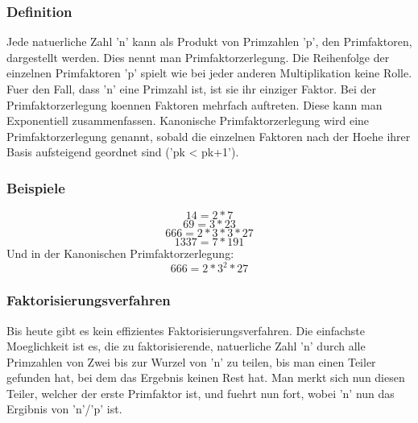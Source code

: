 \subsubsection{Definition}
Jede natuerliche Zahl 'n' kann als Produkt von Primzahlen 'p', den Primfaktoren, dargestellt werden. Dies nennt man Primfaktorzerlegung. Die Reihenfolge der einzelnen Primfaktoren 'p' spielt wie bei jeder anderen Multiplikation keine Rolle. Fuer den Fall, dass 'n' eine Primzahl ist, ist sie ihr einziger Faktor. Bei der Primfaktorzerlegung koennen Faktoren mehrfach auftreten. Diese kann man Exponentiell zusammenfassen. Kanonische Primfaktorzerlegung wird eine Primfaktorzerlegung genannt, sobald die einzelnen Faktoren nach der Hoehe ihrer Basis aufsteigend geordnet sind ('pk < pk+1').
\subsubsection{Beispiele}
\begin{equation}
14 = 2 * 7
\end{equation}
\begin{equation}
69 = 3 * 23
\end{equation}
\begin{equation}
666 = 2 * 3 * 3 * 27
\end{equation}
\begin{equation}
1337 = 7 * 191
\end{equation}
Und in der Kanonischen Primfaktorzerlegung:
\begin{equation}
666 = 2 * 3^2 * 27
\end{equation}
\subsubsection{Faktorisierungsverfahren}
Bis heute gibt es kein effizientes Faktorisierungsverfahren. Die einfachste Moeglichkeit ist es, die zu faktorisierende, natuerliche Zahl 'n' durch alle Primzahlen von Zwei bis zur Wurzel von 'n' zu teilen, bis man einen Teiler gefunden hat, bei dem das Ergebnis keinen Rest hat. Man merkt sich nun diesen Teiler, welcher der erste Primfaktor ist, und fuehrt nun fort, wobei 'n' nun das Ergibnis von 'n'/'p' ist.